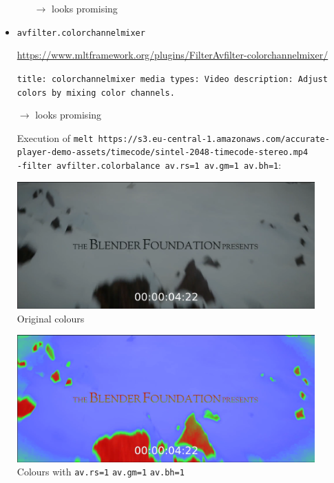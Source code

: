 \documentclass[12pt,a4paper]{article}
\begin{document}
\begin{itemize}
\begin{itemize}
		$\rightarrow$ looks promising
		
	\end{itemize}
		
		\newpage
		
		\item \texttt{avfilter.colorchannelmixer}
		
		\url{https://www.mltframework.org/plugins/FilterAvfilter-colorchannelmixer/}
		
		\texttt{title: colorchannelmixer \newline
			media types: Video \newline
			description: Adjust colors by mixing color channels.}
		
		$\rightarrow$ looks promising
		
		Execution of \texttt{melt https://s3.eu-central-1.amazonaws.com/accurate-player\--demo-assets/timecode/sintel-2048-timecode-stereo.mp4 \\ -filter avfilter.colorbalance av.rs=1 av.gm=1 av.bh=1}:
		
		
		\begin{minipage}{0.5\textwidth}
			\includegraphics[width=0.9\textwidth]{colourdefault.png}
			Original colours
		\end{minipage}\begin{minipage}{0.5\textwidth}
			\includegraphics[width=0.9\textwidth]{colourhigh.png}
			Colours with \texttt{av.rs=1} \texttt{av.gm=1} \texttt{av.bh=1}
		\end{minipage}
	

\end{itemize}
\end{document}
